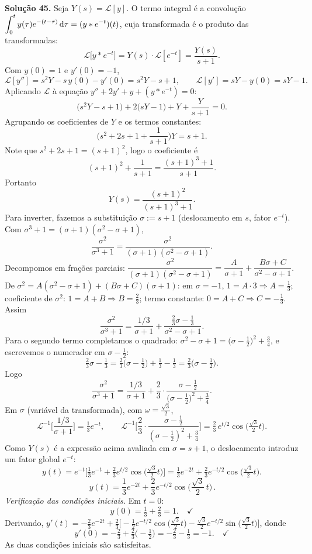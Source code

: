 \bigskip\noindent\textbf{Solução 45.}\quad
Seja $Y(s)=\mathcal{L}[y]$. O termo integral é a convolução $\displaystyle\int_0^t y(\tau)e^{-(t-\tau)}\,\mathrm{d}\tau=(y*e^{-t})(t)$, cuja transformada é o produto das transformadas:
\[
\mathcal{L}\big[y*e^{-t}\big]=Y(s)\cdot\mathcal{L}[e^{-t}]=\frac{Y(s)}{s+1}.
\]
Com $y(0)=1$ e $y'(0)=-1$,
\[
\mathcal{L}[y'']=s^2Y-s\,y(0)-y'(0)=s^2Y-s+1,\qquad
\mathcal{L}[y']=sY-y(0)=sY-1.
\]
Aplicando $\mathcal{L}$ à equação $y''+2y'+y+(y*e^{-t})=0$:
\[
\big(s^2Y-s+1\big)+2\big(sY-1\big)+Y+\frac{Y}{s+1}=0.
\]
Agrupando os coeficientes de $Y$ e os termos constantes:
\[
\Big(s^2+2s+1+\frac{1}{s+1}\Big)Y=s+1.
\]
Note que $s^2+2s+1=(s+1)^2$, logo o coeficiente é
\[
(s+1)^2+\frac{1}{s+1}=\frac{(s+1)^3+1}{s+1}.
\]
Portanto
\[
Y(s)=\frac{(s+1)^2}{(s+1)^3+1}.
\]
Para inverter, fazemos a substituição $\sigma:=s+1$ (deslocamento em $s$, fator $e^{-t}$). Com $\sigma^3+1=(\sigma+1)(\sigma^2-\sigma+1)$,
\[
\frac{\sigma^2}{\sigma^3+1}=\frac{\sigma^2}{(\sigma+1)(\sigma^2-\sigma+1)}.
\]
Decompomos em frações parciais: $\dfrac{\sigma^2}{(\sigma+1)(\sigma^2-\sigma+1)}=\dfrac{A}{\sigma+1}+\dfrac{B\sigma+C}{\sigma^2-\sigma+1}$. De $\sigma^2=A(\sigma^2-\sigma+1)+(B\sigma+C)(\sigma+1)$:
em $\sigma=-1$, $1=A\cdot3\Rightarrow A=\tfrac13$; coeficiente de $\sigma^2$: $1=A+B\Rightarrow B=\tfrac23$; termo constante: $0=A+C\Rightarrow C=-\tfrac13$. Assim
\[
\frac{\sigma^2}{\sigma^3+1}=\frac{1/3}{\sigma+1}+\frac{\tfrac23\sigma-\tfrac13}{\sigma^2-\sigma+1}.
\]
Para o segundo termo completamos o quadrado: $\sigma^2-\sigma+1=\big(\sigma-\tfrac12\big)^2+\tfrac34$, e escrevemos o numerador em $\sigma-\tfrac12$:
\[
\tfrac23\sigma-\tfrac13=\tfrac23\big(\sigma-\tfrac12\big)+\tfrac13-\tfrac13=\tfrac23\big(\sigma-\tfrac12\big).
\]
Logo
\[
\frac{\sigma^2}{\sigma^3+1}=\frac{1/3}{\sigma+1}+\frac{2}{3}\cdot\frac{\sigma-\tfrac12}{\big(\sigma-\tfrac12\big)^2+\tfrac34}.
\]
Em $\sigma$ (variável da transformada), com $\omega=\tfrac{\sqrt3}{2}$,
\[
\mathcal{L}^{-1}\Big[\frac{1/3}{\sigma+1}\Big]=\tfrac13 e^{-t},\qquad
\mathcal{L}^{-1}\Big[\frac{2}{3}\cdot\frac{\sigma-\tfrac12}{(\sigma-\tfrac12)^2+\tfrac34}\Big]=\tfrac23\,e^{t/2}\cos\!\Big(\tfrac{\sqrt3}{2}t\Big).
\]
Como $Y(s)$ é a expressão acima avaliada em $\sigma=s+1$, o deslocamento introduz um fator global $e^{-t}$:
\[
y(t)=e^{-t}\Big[\tfrac13 e^{-t}+\tfrac23 e^{t/2}\cos\!\Big(\tfrac{\sqrt3}{2}t\Big)\Big]
=\tfrac13 e^{-2t}+\tfrac23 e^{-t/2}\cos\!\Big(\tfrac{\sqrt3}{2}t\Big).
\]
\[
\boxed{\,y(t)=\dfrac13 e^{-2t}+\dfrac23 e^{-t/2}\cos\!\Big(\dfrac{\sqrt3}{2}\,t\Big)\,}.
\]
\emph{Verificação das condições iniciais.} Em $t=0$:
\[
y(0)=\tfrac13+\tfrac23=1.\quad\checkmark
\]
Derivando, $y'(t)=-\tfrac23 e^{-2t}+\tfrac23\Big[-\tfrac12 e^{-t/2}\cos\big(\tfrac{\sqrt3}{2}t\big)-\tfrac{\sqrt3}{2}e^{-t/2}\sin\big(\tfrac{\sqrt3}{2}t\big)\Big]$, donde
\[
y'(0)=-\tfrac23+\tfrac23\big(-\tfrac12\big)=-\tfrac23-\tfrac13=-1.\quad\checkmark
\]
As duas condições iniciais são satisfeitas.


